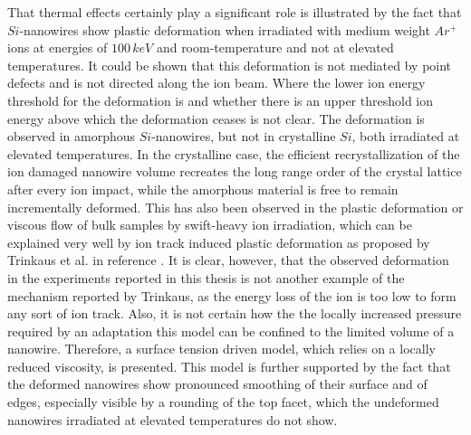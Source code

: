 That thermal effects certainly play a significant role is illustrated by the fact that $Si$-nanowires show plastic deformation when irradiated with medium weight $Ar^+$ ions at energies of $100\,keV$ and room-temperature and not at elevated temperatures. It could be shown that this deformation is not mediated by point defects and is not directed along the ion beam. Where the lower ion energy threshold for the deformation is and whether there is an upper threshold ion energy above which the deformation ceases is not clear. The deformation is observed in amorphous $Si$-nanowires, but not in crystalline $Si$, both irradiated at elevated temperatures. In the crystalline case, the efficient recrystallization of the ion damaged nanowire volume recreates the long range order of the crystal lattice after every ion impact, while the amorphous material is free to remain incrementally deformed. This has also been observed in the plastic deformation or viscous flow of bulk samples by swift-heavy ion irradiation, which can be explained very well by ion track induced plastic deformation as proposed by Trinkaus et al. in reference \cite{trinkaus_viscoelastic_1995}. It is clear, however, that the observed deformation in the experiments reported in this thesis is not another example of the mechanism reported by Trinkaus, as the energy loss of the ion is too low to form any sort of ion track. Also, it is not certain how the the locally increased pressure required by an adaptation this model can be confined to the limited volume of a nanowire. Therefore, a surface tension driven model, which relies on a locally reduced viscosity, is presented. This model is further supported by the fact that the deformed nanowires show pronounced smoothing of their surface and of edges, especially visible by a rounding of the top facet, which the undeformed nanowires irradiated at elevated temperatures do not show.

